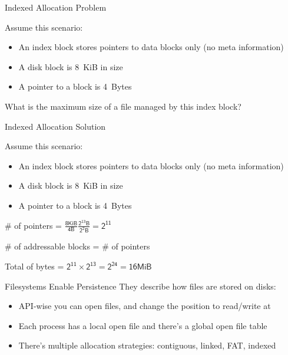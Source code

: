   \begin{frame}{Indexed Allocation Problem}
    
    Assume this scenario:
    \begin{itemize}
      \item An index block stores pointers to data blocks only (no meta information)
      \item A disk block is 8~KiB in size
      \item A pointer to a block is 4~Bytes
    \end{itemize}

    \vspace{2em}

    What is the maximum size of a file managed by this index block?
  \end{frame}

  \begin{frame}{Indexed Allocation Solution}
    
    Assume this scenario:
    \begin{itemize}
      \item An index block stores pointers to data blocks only (no meta information)
      \item A disk block is 8~KiB in size
      \item A pointer to a block is 4~Bytes
    \end{itemize}

    \vspace{2em}

    \# of pointers = $\mathsf{\frac{8 KiB}{4 B} \frac{2^{13} B}{2^2 B} = 2^{11}}$

    \# of addressable blocks = \# of pointers

    Total of bytes = $\mathsf{2^{11} \times 2^{13} = 2^{24} = 16 MiB}$
  \end{frame}

  \begin{frame}{Filesystems Enable Persistence}
    They describe how files are stored on disks:
    \begin{itemize}
      \item API-wise you can open files, and change the position to read/write
            at
      \item Each process has a local open file and there's a global open file
            table
      \item There's multiple allocation strategies: contiguous, linked, FAT, indexed
    \end{itemize}
  \end{frame}

